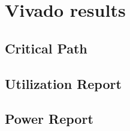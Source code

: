 \chapter{Vivado results}

\section{Critical Path}



\section{Utilization Report}


\section{Power Report}

